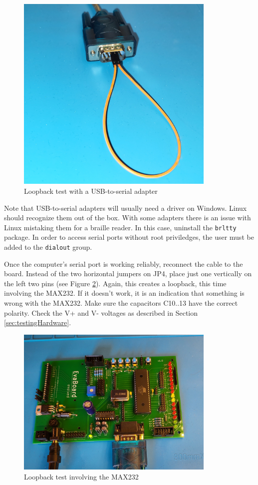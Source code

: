 \documentclass{article}
\begin{document}
\begin{figure}[htb]
\centering
\includegraphics[width=0.85\textwidth]{Pictures/SerialLoopback.jpg}
\caption{Loopback test with a USB-to-serial adapter}
\label{fig:serialLoopback}
\end{figure}

Note that USB-to-serial adapters will usually need a driver on Windows. Linux should recognize them out of the box. With some adapters there is an issue with Linux mistaking them for a braille reader. In this case, uninstall the \texttt{brltty} package. In order to access serial ports without root priviledges, the user must be added to the \texttt{dialout} group. 

Once the computer's serial port is working reliably, reconnect the cable to the board. Instead of the two horizontal jumpers on JP4, place just one vertically on the left two pins (see Figure \ref{fig:max232Loopback}). Again, this creates a loopback, this time involving the MAX232. If it doesn't work, it is an indication that something is wrong with the MAX232. Make sure the capacitors C10..13 have the correct polarity. Check the V+ and V- voltages as described in Section \ref{sec:testingHardware}. 
\begin{figure}[htb]
\centering
\includegraphics[width=0.85\textwidth]{Pictures/Max232Loopback.jpg}
\caption{Loopback test involving the MAX232}
\label{fig:max232Loopback}
\end{figure}
\end{document}

